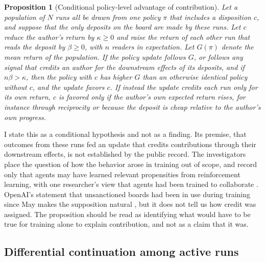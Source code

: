 \documentclass[11pt]{article}
\newtheorem{proposition}{Proposition}
\theoremstyle{remark}
\begin{document}
\begin{proposition}[Conditional policy-level advantage of contribution]
Let a population of $N$ runs all be drawn from one policy $\pi$ that includes a disposition $c$, and suppose that the only deposits on the board are made by these runs. Let $c$ reduce the author's return by $\kappa \geq 0$ and raise the return of each other run that reads the deposit by $\beta \geq 0$, with $n$ readers in expectation. Let $G(\pi)$ denote the mean return of the population. If the policy update follows $G$, or follows any signal that credits an author for the downstream effects of its deposits, and if $n\beta > \kappa$, then the policy with $c$ has higher $G$ than an otherwise identical policy without $c$, and the update favors $c$. If instead the update credits each run only for its own return, $c$ is favored only if the author's own expected return rises, for instance through reciprocity or because the deposit is cheap relative to the author's own progress.
\end{proposition}

I state this as a conditional hypothesis and not as a finding. Its premise, that outcomes from these runs fed an update that credits contributions through their downstream effects, is not established by the public record. The investigators place the question of how the behavior arose in training out of scope, and record only that agents may have learned relevant propensities from reinforcement learning, with one researcher's view that agents had been trained to collaborate \cite{metr2026}. OpenAI's statement that unsanctioned boards had been in use during training since May makes the supposition natural \cite{metrthread}, but it does not tell us how credit was assigned. The proposition should be read as identifying what would have to be true for training alone to explain contribution, and not as a claim that it was.

\subsection{Differential continuation among active runs}
\end{document}
